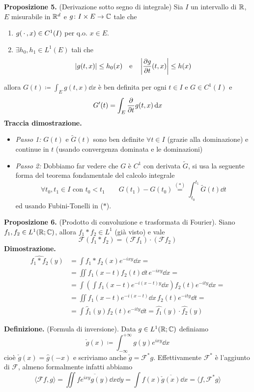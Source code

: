 \textbf{Proposizione 5.} (Derivazione sotto segno di integrale)
Sia $I$ un intervallo di $\mathbb R$, $E$ misurabile in $\mathbb R^d$ e $g \colon I \times E \to \mathbb C$ tale che
\begin{enumerate}
	\item $g(\,\cdot\,, x) \in C^1(I)$ per q.o. $x \in E$.
	\item $\exists h_0, h_1 \in L^1(E)$ tali che
		$$
		|g(t, x)| \leq h_0(x) 
		\quad
		\text{e}
		\quad
		\left|\frac{\partial g}{\partial t}(t, x)\right| \leq h(x)
		$$
\end{enumerate}
allora $G(t) \coloneqq \int_E g(t, x) \dd x$ è ben definita per ogni $t \in I$ e $G \in C^1(I)$ e
$$
G'(t) = \int_E \frac{\partial}{\partial t}g(t, x) \,\mathrm{d} x
$$
\textbf{Traccia dimostrazione.}
\begin{itemize}
	\item \textit{Passo 1:} $G(t)$ e $\tilde G(t)$ sono ben definite $\forall t \in I$ (grazie alla dominazione) e continue in $t$ (usando convergenza dominata e le dominazioni)
	\item \textit{Passo 2:} Dobbiamo far vedere che $G$ è $C^1$ con derivata $\tilde G$, si usa la seguente forma del teorema fondamentale del calcolo integrale
		$$
		\forall t_0, t_1 \in I \text{ con } t_0 < t_1
		\qquad
		G(t_1) - G(t_0) \overset{(*)}{=} \int_{t_0}^{t_1} \tilde G(t) \dd t
		$$
		ed usando Fubini-Tonelli in ($*$).
\end{itemize}

\textbf{Proposizione 6.} (Prodotto di convoluzione e trasformata di Fourier).
Siano $f_1, f_2 \in L^1(\mathbb R; \mathbb C)$, allora $f_1 \ast f_2 \in L^1$ (già visto) e vale
$$
\mathcal F(f_1 \ast f_2) = (\mathcal F f_1) \cdot (\mathcal F f_2)
$$
\textbf{Dimostrazione.}
$$
\begin{aligned}
	\hat{f_1 \ast f_2}(y)
	&= \int f_1 \ast f_2 (x) e^{-ixy} \dd x = \\
	&= \iint f_1(x - t) f_2(t) \dd t \, e^{-ixy} \dd x = \\
	&= \int \left(\int f_1(x - t) e^{-i(x - t)y} \dd x \right) f_2(t) e^{-ity} \dd x = \\
	&= \iint f_1(x - t) e^{-i(x-t)} \dd x \, f_2(t) e^{-ity} \dd t = \\
	&= \int \hat f_1(y) f_2(t) e^{-ity} \dd t = \hat{f_1}(y) \cdot \hat{f_2}(y)
\end{aligned}
$$

\textbf{Definizione.} (Formula di inversione).
Data $g \in L^1(\mathbb R; \mathbb C)$ definiamo
$$
\check g(x) \coloneqq \int_{-\infty}^{+\infty} g(y) e^{ixy} \dd x
$$
cioè $\check g(x) = \hat g(-x)$ e scriviamo anche $\check g = \mathcal F^* g$. Effettivamente $\mathcal F^*$ è l'aggiunto di $\mathcal F$, almeno formalmente infatti abbiamo
$$
\langle \mathcal F f, g \rangle
= \iint f \overline{e^{ixy} g(y)} \dd x \dd y
= \int f(x) \overline{\check g(x)} \dd x
= \langle f, \mathcal F^* g \rangle
$$

